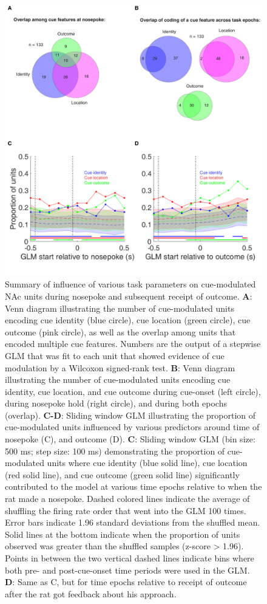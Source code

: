 \documentclass[11pt]{article}
\newcommand{\bsf}[1]{\textbf{#1}}
\begin{document}
 \begin{figure}[ht!]
\centering
\includegraphics[height=0.8\textheight]{Fig 8 - Q2.pdf}
\caption{Summary of influence of various task parameters on cue-modulated NAc
units during nosepoke and subsequent receipt of outcome. \bsf{A}: Venn diagram illustrating the number of cue-modulated units encoding cue identity (blue circle), cue location (green circle), cue outcome (pink circle), as well as the overlap among units that encoded multiple cue features. Numbers are the output of a stepwise GLM that was fit to each unit that showed evidence of cue modulation by a Wilcoxon signed-rank test.  \bsf{B}: Venn diagram illustrating the number of cue-modulated units encoding cue identity, cue location, and cue outcome during cue-onset (left circle), during nosepoke hold (right circle), and during both epochs (overlap). \bsf{C-D}: Sliding window GLM illustrating the proportion of cue-modulated units influenced by various predictors around time of nosepoke (C), and outcome (D). \bsf{C}: Sliding window GLM (bin size: 500 ms; step size: 100 ms) demonstrating the proportion of cue-modulated units where cue identity (blue solid line), cue location (red solid line), and cue outcome (green solid line) significantly contributed to the model at various time epochs relative to when the rat made a nosepoke. Dashed colored lines indicate the average of shuffling the firing rate order that went into the GLM 100 times. Error bars indicate 1.96 standard deviations from the shuffled mean. Solid lines at the bottom indicate when the proportion of units observed was greater than the shuffled samples (z-score > 1.96). Points in between the two vertical dashed lines indicate bins where both pre- and post-cue-onset time periods were used in the GLM. \bsf{D}: Same as C, but for time epochs relative to receipt of outcome after the rat got feedback about his approach.}
\label{fig:Q2}
\end{figure} \clearpage
\end{document}
